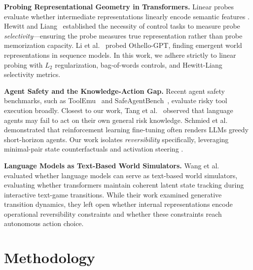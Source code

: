 \documentclass[10pt,twocolumn,letterpaper]{article}
\begin{document}
\textbf{Probing Representational Geometry in Transformers.} Linear probes evaluate whether intermediate representations linearly encode semantic features \cite{alain2016understanding}. Hewitt and Liang~\cite{hewitt2019designing} established the necessity of control tasks to measure probe \textit{selectivity}---ensuring the probe measures true representation rather than probe memorization capacity. Li et al.~\cite{li2023emergent} probed Othello-GPT, finding emergent world representations in sequence models. In this work, we adhere strictly to linear probing with $L_2$ regularization, bag-of-words controls, and Hewitt-Liang selectivity metrics.

\textbf{Agent Safety and the Knowledge-Action Gap.} Recent agent safety benchmarks, such as ToolEmu~\cite{ruan2024identifying} and SafeAgentBench~\cite{yin2024safeagentbench}, evaluate risky tool execution broadly. Closest to our work, Tang et al.~\cite{tang2025lm} observed that language agents may fail to act on their own general risk knowledge. Schmied et al.~\cite{schmied2026llms} demonstrated that reinforcement learning fine-tuning often renders LLMs greedy short-horizon agents. Our work isolates \textit{reversibility} specifically, leveraging minimal-pair state counterfactuals and activation steering \cite{rimsky2024steering}.

\textbf{Language Models as Text-Based World Simulators.} Wang et al.~\cite{wang2024can} evaluated whether language models can serve as text-based world simulators, evaluating whether transformers maintain coherent latent state tracking during interactive text-game transitions. While their work examined generative transition dynamics, they left open whether internal representations encode operational reversibility constraints and whether these constraints reach autonomous action choice.

\section{Methodology}
\end{document}
